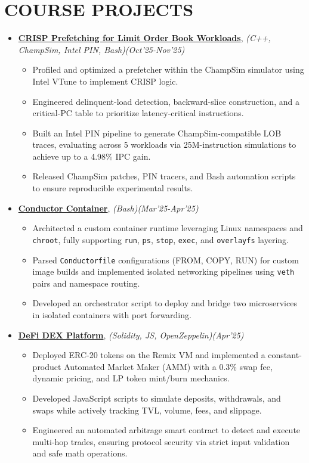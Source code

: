 \documentclass[a4paper,10pt]{article}
\begin{document}
\section*{COURSE PROJECTS}
\begin{itemize}

\item \textbf{\href{https://github.com/prasoon054/crisp-champsim}{CRISP Prefetching for Limit Order Book Workloads}}, \emph{(C++, ChampSim, Intel PIN, Bash)}\hfill \emph{(Oct'25-Nov'25)}
\begin{itemize}
    \item Profiled and optimized a prefetcher within the ChampSim simulator using Intel VTune to implement CRISP logic.
    \item Engineered delinquent-load detection, backward-slice construction, and a critical-PC table to prioritize latency-critical instructions.
    \item Built an Intel PIN pipeline to generate ChampSim-compatible LOB traces, evaluating across 5 workloads via 25M-instruction simulations to achieve up to a 4.98\% IPC gain.
    \item Released ChampSim patches, PIN tracers, and Bash automation scripts to ensure reproducible experimental results.
\end{itemize}

\item \textbf{\href{https://github.com/pratikwadekar88/Assignments_IITB/tree/main/VCC/Assignment3}{Conductor Container}}, \emph{(Bash)}\hfill \emph{(Mar'25-Apr'25)}
\begin{itemize}
    \item Architected a custom container runtime leveraging Linux namespaces and \texttt{chroot}, fully supporting \texttt{run}, \texttt{ps}, \texttt{stop}, \texttt{exec}, and \texttt{overlayfs} layering.
    \item Parsed \texttt{Conductorfile} configurations (FROM, COPY, RUN) for custom image builds and implemented isolated networking pipelines using \texttt{veth} pairs and namespace routing.
    \item Developed an orchestrator script to deploy and bridge two microservices in isolated containers with port forwarding.
\end{itemize}

\item \textbf{\href{https://github.com/pratikwadekar88/DEX}{DeFi DEX Platform}}, \emph{(Solidity, JS, OpenZeppelin)}\hfill \emph{(Apr'25)}
\begin{itemize}
    \item Deployed ERC-20 tokens on the Remix VM and implemented a constant-product Automated Market Maker (AMM) with a 0.3\% swap fee, dynamic pricing, and LP token mint/burn mechanics.
    \item Developed JavaScript scripts to simulate deposits, withdrawals, and swaps while actively tracking TVL, volume, fees, and slippage.
    \item Engineered an automated arbitrage smart contract to detect and execute multi-hop trades, ensuring protocol security via strict input validation and safe math operations.
\end{itemize}


\end{itemize}
\end{document}
